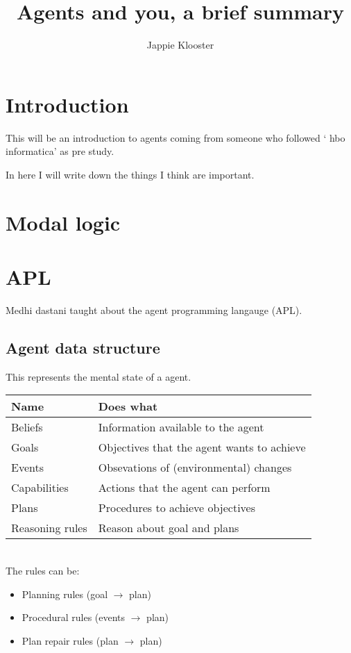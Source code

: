 \documentclass{article}
\begin{document}
\lstset{language=Java}
\author{Jappie Klooster}
\title{Agents and you, a brief summary}
\maketitle

\section{Introduction}
This will be an introduction to agents coming from someone who followed
` hbo informatica' as pre study.

In here I will write down the things I think are important.

\section{Modal logic}


\section{APL}
Medhi dastani taught about the agent programming langauge (APL).
\subsection{Agent data structure}
This represents the mental state of a agent. \\
\begin{tabular}{ll}
	Name & Does what \\ \toprule
	Beliefs & Information available to the agent \\
	Goals & Objectives that the agent wants to achieve \\
	Events & Obsevations of (environmental) changes \\
	Capabilities & Actions that the agent can perform \\
	Plans & Procedures to achieve objectives \\
	Reasoning rules & Reason about goal and plans \\
\end{tabular} \\

\noindent
The rules can be:

\begin{itemize}
	\item Planning rules (goal $\to$ plan)
	\item Procedural rules (events $\to$ plan)
	\item Plan repair rules (plan $\to$ plan)
\end{itemize}
\end{document}
